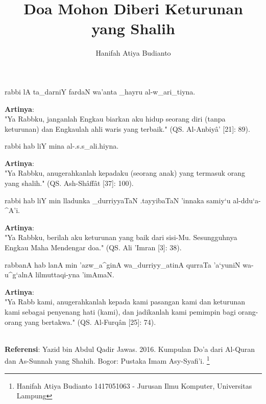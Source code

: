 \documentclass[a4paper,12pt]{article}
\title{\Large Doa Mohon Diberi Keturunan yang Shalih}
\author{\calligra Hanifah Atiya Budianto}
\begin{document}
\sffamily
\maketitle 
\fullvocalize
{}
\begin{arabtext}
\noindent
rabbi lA ta_darniY fardaN wa'anta _hayru al-w_ari_tiyna.\\
\end{arabtext}
\noindent
\textbf{Artinya}:\\
\indent
"Ya Rabbku, janganlah Engkau biarkan aku hidup seorang diri (tanpa 
keturunan) dan Engkaulah ahli waris yang terbaik." (QS. Al-Anbiy\^{a}' 
[21]: 89).\\
\begin{arabtext}
\noindent
rabbi hab liY mina al-.s.s_ali.hiyna.\\
\end{arabtext}
\noindent
\textbf{Artinya}:\\
\indent
"Ya Rabbku, anugerahkanlah kepadaku (seorang anak) yang termasuk orang yang
shalih." (QS. Ash-Sh\^{a}ff\^{a}t [37]: 100).\\
\begin{arabtext}
\noindent
rabbi hab liY min lladunka _durriyyaTaN .tayyibaTaN 'innaka samiy`u 
al-ddu`a-^A'i.\\
\end{arabtext}
\noindent
\textbf{Artinya}:\\
\indent
"Ya Rabbku, berilah aku keturunan yang baik dari sisi-Mu. Sesungguhnya 
Engkau Maha Mendengar doa." (QS. Ali 'Imran [3]: 38).\\
\begin{arabtext}
\noindent
rabbanA hab lanA min 'azw_a^ginA wa_durriyy_atinA qurraTa 'a`yuniN 
wa-u^g`alnA lilmuttaqi-yna 'imAmaN.\\
\end{arabtext}
\noindent
\textbf{Artinya}:\\
\indent
"Ya Rabb kami, anugerahkanlah kepada kami pasangan kami dan keturunan kami 
sebagai penyenang hati (kami), dan jadikanlah kami pemimpin bagi 
orang-orang yang bertakwa." (QS. Al-Furq\^{a}n [25]: 74).\\\\
\par
\noindent
\textbf{Referensi}: Yazid bin Abdul Qadir Jawas. 2016. Kumpulan Do'a dari
Al-Quran dan As-Sunnah yang Shahih. Bogor: Pustaka Imam Asy-Syafi'i.
\footnote{Hanifah Atiya Budianto 1417051063 - Jurusan Ilmu Komputer,
Universitas Lampung}
\end{document}
